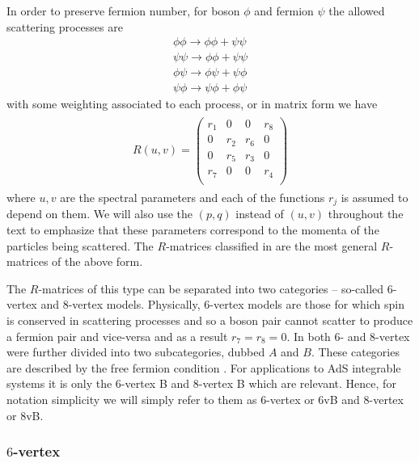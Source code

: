 \documentclass[12pt,a4paper]{article}
\numberwithin{equation}{section}
\begin{document}
In order to preserve fermion number, for boson $\phi$  and fermion $ \psi $ the allowed scattering processes are 
\begin{align*}
\phi\phi\rightarrow \phi \phi+\psi \psi \\
\psi\psi\rightarrow \phi \phi+\psi \psi \\
\phi\psi\rightarrow \phi \psi+\psi \phi \\
\psi\phi\rightarrow \psi \phi+\phi \psi
\end{align*}
with some weighting associated to each process, or in matrix form we have
%
\begin{align}
\begin{split}
R(u,v)  =\begin{pmatrix}
r_1 & 0 & 0 & r_8 \\
0 & r_2 & r_6 & 0 \\
0 & r_5 & r_3 & 0 \\
r_7 & 0 & 0 & r_4 \\
\end{pmatrix}
\end{split}
\label{generalR8vertex}
\end{align}
%
where $u,v$ are the spectral parameters and each of the functions $r_j$ is assumed to depend on them. We will also use the $(p,q)$ instead of $(u,v)$ throughout the text to emphasize that these parameters correspond to the momenta of the particles being scattered. The $R$-matrices classified in \cite{deLeeuw:2020ahe} are the most general $R$-matrices of the above form.

The $R$-matrices of this type can be separated into two categories -- so-called $6$-vertex and $8$-vertex models. Physically, $6$-vertex models are those for which spin is conserved in scattering processes and so a boson pair cannot scatter to produce a fermion pair and vice-versa and as a result $r_7=r_8=0$. In \cite{deLeeuw:2020ahe} both $6$- and $8$-vertex were further divided into two subcategories, dubbed $A$ and $B$. These categories are described by the free fermion condition \cite{deLeeuw:2020bgo}. For applications to AdS integrable systems it is only the $6$-vertex B and $8$-vertex B which are relevant. Hence, for notation simplicity we will simply refer to them as $6$-vertex or 6vB and $8$-vertex or 8vB.


\subsubsection*{$6$-vertex}
\end{document}

